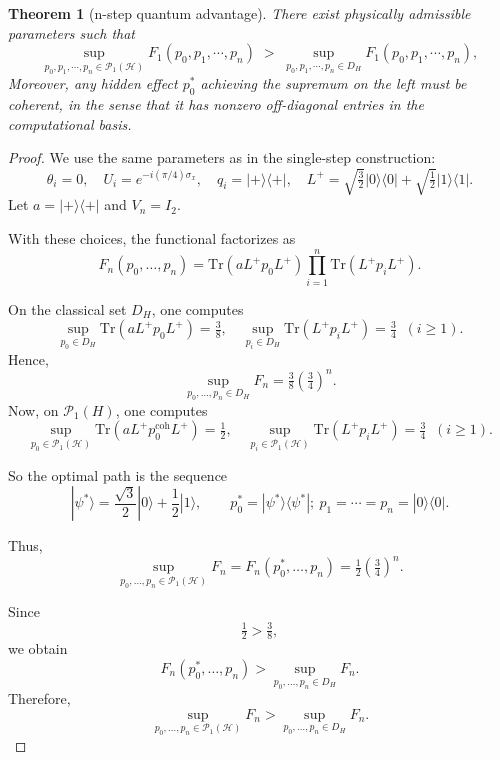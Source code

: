 \documentclass[12pt, reco]{article}
\newtheorem{theorem}{Theorem}[section]
\begin{document}
\begin{theorem}[n-step quantum advantage]
\label{thm:coherent-optimal-m1}
There exist physically admissible parameters such that
\[
\sup_{p_0,p_1,\cdots,p_n\in\mathcal{P}_{1}(\mathcal{H})} F_1(p_0,p_1,\cdots, p_n)
\;>\;
\sup_{p_0,p_1, \cdots, p_n\in D_H} F_1(p_0,p_1,\cdots, p_n),
\] 
Moreover, any hidden effect \(p_0^*\) achieving the supremum on the left must be coherent, in the sense that it has nonzero off-diagonal entries in the computational basis.

\end{theorem}
\begin{proof}
We use the same parameters as in the single-step construction:
\[
\theta_i=0,\quad U_i=e^{-i(\pi/4)\sigma_x},\quad
q_i=|+\rangle\langle+|,\quad
L^+=\sqrt{\tfrac{3}{2}}|0\rangle\langle0|+\sqrt{\tfrac{1}{2}}|1\rangle\langle1|.
\]
Let \(a=|+\rangle\langle+|\) and \(V_n=I_2\).

With these choices, the functional factorizes as
\[
F_n(p_0,\dots,p_n)
=\mathrm{Tr}(aL^+p_0L^+)\prod_{i=1}^n \mathrm{Tr}(L^+p_iL^+).
\]

\medskip

\noindent

On the classical set \(D_H\), one computes
\[
\sup_{p_0\in D_H} \mathrm{Tr}(aL^+p_0L^+)=\tfrac{3}{8},
\quad
\sup_{p_i\in D_H} \mathrm{Tr}(L^+p_iL^+)=\tfrac{3}{4}\;\;(i\ge1).
\]
Hence,
\[
\sup_{p_0,\dots,p_n\in D_H} F_n
=
\tfrac{3}{8}\left(\tfrac{3}{4}\right)^n.
\]
Now, on  \(\mathcal{P}_1(H)\), one computes
\[
\sup_{p_0\in \mathcal{P}_1(\mathcal{H})} \mathrm{Tr}(aL^+ p_0^{\mathrm{coh}}L^+)=\tfrac{1}{2},
\quad
\sup_{p_i\in \mathcal{P}_1(\mathcal{H})} \mathrm{Tr}(L^+p_iL^+)=\tfrac{3}{4}\;\;(i\ge1).
\]

So the optimal path is the sequence
\[
|\psi^*\rangle
=
\frac{\sqrt{3}}{2}|0\rangle + \frac{1}{2}|1\rangle,
\qquad
p_0^* = |\psi^*\rangle\langle\psi^*|; \ p_1=\cdots=p_n=|0\rangle\langle0|.
\]


Thus,
\[
\sup_{p_0,\dots,p_n\in\mathcal{P}_1(\mathcal{H})} F_n=F_n(p_0^*,\dots,p_n)
=
\tfrac{1}{2}
\left(\tfrac{3}{4}\right)^n.
\]

\medskip

Since
\[
\tfrac{1}{2} > \tfrac{3}{8},
\]
we obtain
\[
F_n(p_0^*,\dots,p_n)
>
\sup_{p_0,\dots,p_n\in D_H} F_n.
\]
Therefore,
\[
\sup_{p_0,\dots,p_n\in\mathcal{P}_1(\mathcal{H})} F_n
>
\sup_{p_0,\dots,p_n\in D_H} F_n.
\]

\medskip
\end{proof}
\end{document}
